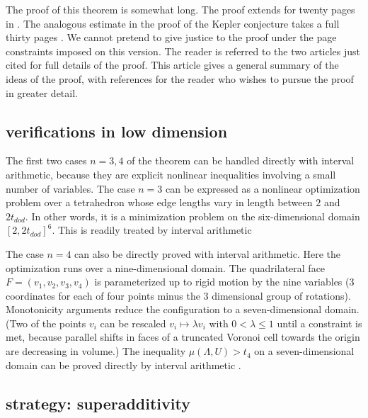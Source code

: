 \documentclass{article} %
\begin{document}
The proof of this theorem is somewhat long.  The proof extends for 
twenty pages in  \cite[pp.19-38]{arx}.  The analogous estimate in
the proof of the Kepler conjecture takes a full thirty pages 
\cite[pp.126-156]{DCG}.
We cannot pretend to give justice to the proof under the page constraints
imposed on this version.  The reader is referred to the
two articles just cited for full details of the proof.  This article
 gives a general summary of the ideas of the proof, with 
references for the reader who wishes to pursue the proof in greater detail.

\subsection{verifications in low dimension}

The first two cases $n=3,4$ of the theorem can be handled directly with
interval arithmetic, because they are explicit nonlinear 
inequalities involving a small number of variables.  The case $n=3$ can
be expressed as a nonlinear optimization problem over a tetrahedron
whose edge lengths vary in length between $2$ and $2t_{dod}$.  In other
words, it is a minimization problem on the six-dimensional 
domain $[2,2t_{dod}]^6$. This is readily treated by interval arithmetic \cite[exact ref~XX]{code}

The case $n=4$ can also be directly proved with interval arithmetic.  
Here the optimization runs over a nine-dimensional domain.  The
quadrilateral face $F=(v_1,v_2,v_3,v_4)$ is parameterized up to rigid
motion by the nine variables (3 coordinates for each of four points
minus the 3 dimensional group of rotations).  Monotonicity arguments
reduce the configuration to a seven-dimensional domain.  (Two of the
points $v_i$ can be rescaled $v_i \mapsto \lambda v_i$ with $0 < \lambda \le 1$ until a constraint is met, 
because parallel shifts in faces of a truncated Voronoi cell towards the origin are decreasing in volume.)  The inequality $\mu(\Lambda,U)> t_4$ on
a seven-dimensional domain can be proved directly by interval arithmetic \cite[exact ref~XX]{code}.

\subsection{strategy: superadditivity}
\end{document}
